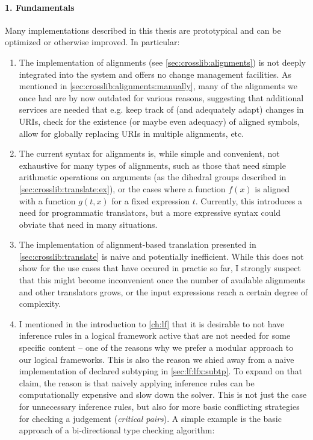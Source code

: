 \paragraph{1. Fundamentals} Many implementations described in this thesis are prototypical and can be optimized or otherwise improved. In particular:
\begin{enumerate}
	\item The implementation of alignments (see \autoref{sec:crosslib:alignments}) is not deeply integrated into the \mmt system and offers no change management facilities. As mentioned in \autoref{sec:crosslib:alignments:manually}, many of the alignments we once had are by now outdated for various reasons, suggesting that additional services are needed that e.g. keep track of (and adequately adapt) changes in URIs, check for the existence (or maybe even adequacy) of aligned symbols, allow for globally replacing URIs in multiple alignments, etc.
	\item The current syntax for alignments is, while simple and convenient, not exhaustive for many types of alignments, such as those that need simple arithmetic operations on arguments (as the dihedral groups described in \autoref{sec:crosslib:translate:ex}), or the cases where a function $f(x)$ is aligned with a function $g(t,x)$ for a fixed expression $t$. Currently, this introduces a need for programmatic translators, but a more expressive syntax could obviate that need in many situations.
	\item The implementation of alignment-based translation presented in \autoref{sec:crosslib:translate} is naive and potentially inefficient. While this does not show for the use cases that have occured in practie so far, I strongly suspect that this might become inconvenient once the number of available alignments and other translators grows, or the input expressions reach a certain degree of complexity.
	\item I mentioned in the introduction to \autoref{ch:lf} that it is desirable to not have inference rules in a logical framework active that are not needed for some specific content -- one of the reasons why we prefer a modular approach to our logical frameworks. This is also the reason we shied away from a naive implementation of declared subtyping in \autoref{sec:lf:lfx:subtp}. To expand on that claim, the reason is that naively applying inference rules can be computationally expensive and slow down the solver. This is not just the case for unnecessary inference rules, but also for more basic conflicting strategies for checking a judgement (\emph{critical pairs}). A simple example is the basic approach of a bi-directional type checking algorithm:
	

\end{enumerate}

